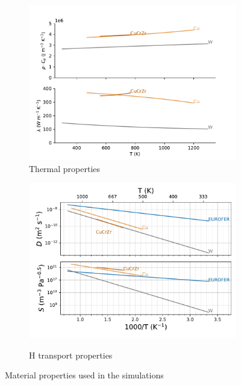 \begin{figure}[ht]
    \centering
    \begin{subfigure}{0.5\linewidth}
        \centering
        \includegraphics[width=\linewidth]{Figures/Chapter3/monoblocks/interface_condition/iter case/thermal_prop.pdf}
        \caption{Thermal properties}
        \label{fig:thermal prop}
    \end{subfigure}%
    \begin{subfigure}{0.5\linewidth}
        \centering
        \includegraphics[width=\linewidth]{Figures/Chapter3/monoblocks/interface_condition/H_properties.pdf}
        \label{fig:H prop}
        \caption{H transport properties}
    \end{subfigure}
    \caption{Material properties used in the simulations \cite{frauenfelder_solution_1969, reiter_compilation_1996, serra_hydrogen_1998, aiello_hydrogen_2002}}
    \label{fig:properties}
\end{figure}

